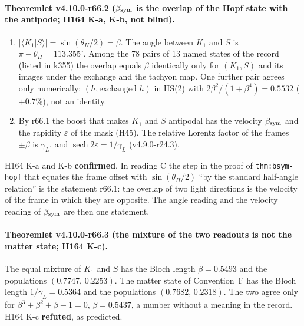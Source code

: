 \paragraph{Theoremlet v4.10.0-r66.2 (\(\beta_{\rm sym}\) is the overlap of the Hopf state with the antipode; H164 K-a, K-b, not blind).}
\begin{enumerate}[leftmargin=2em]
\item[(a)] \(|\langle K_1|S\rangle|=\sin(\theta_H/2)=\beta\).  The angle between \(K_1\) and \(S\) is \(\pi-\theta_H=113.355^\circ\).  Among the 78
pairs of 13 named states of the record (listed in k355) the overlap equals \(\beta\) identically only for \((K_1,S)\) and its images under the exchange
and the tachyon map.  One further pair agrees only numerically: \((h,\text{exchanged }h)\) in HS(2) with \(2\beta^2/(1+\beta^4)=0.5532\) (\(+0.7\%\)), not an
identity.
\item[(b)] By r66.1 the boost that makes \(K_1\) and \(S\) antipodal has the velocity \(\beta_{\rm sym}\) and the rapidity \(\varepsilon\) of the mask
(H45).  The relative Lorentz factor of the frames \(\pm\beta\) is \(\gamma_L\), and \(\operatorname{sech}2\varepsilon=1/\gamma_L\) (v4.9.0-r24.3).
\end{enumerate}
H164 K-a and K-b \textbf{confirmed}.  In reading C the step in the proof of \texttt{thm:bsym-hopf} that equates the frame offset with
\(\sin(\theta_H/2)\) ``by the standard half-angle relation'' is the statement r66.1: the overlap of two light directions is the velocity of the frame
in which they are opposite.  The angle reading and the velocity reading of \(\beta_{\rm sym}\) are then one statement.

\paragraph{Theoremlet v4.10.0-r66.3 (the mixture of the two readouts is not the matter state; H164 K-c).}
The equal mixture of \(K_1\) and \(S\) has the Bloch length \(\beta=0.5493\) and the populations \((0.7747,\,0.2253)\).  The matter state of
Convention~F has the Bloch length \(1/\gamma_L=0.5364\) and the populations \((0.7682,\,0.2318)\).  The two agree only for
\(\beta^3+\beta^2+\beta-1=0\), \(\beta=0.5437\), a number without a meaning in the record.  H164 K-c \textbf{refuted}, as predicted.

